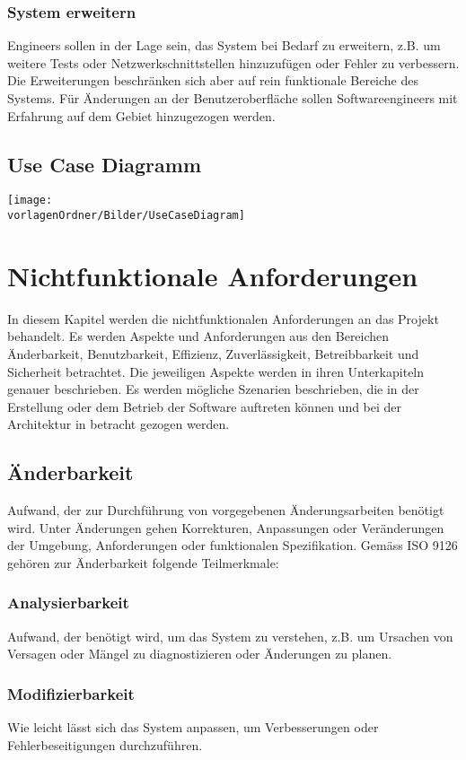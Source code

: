 \documentclass[
	ngerman,
	toc=listof, %
	toc=bibliography, %
	footnotes=multiple, %
	parskip=half, %
	numbers=noendperiod %
]{scrartcl}
\newcommand{\vorlagenOrdner}{../../99_Vorlagen} %
\begin{document}
		\subsubsection{System erweitern}
			Engineers sollen in der Lage sein, das System bei Bedarf zu erweitern, z.B. um weitere Tests oder Netzwerkschnittstellen hinzuzufügen oder Fehler zu verbessern.
			Die Erweiterungen beschränken sich aber auf rein funktionale Bereiche des Systems. Für Änderungen an der Benutzeroberfläche sollen Softwareengineers mit Erfahrung auf dem Gebiet hinzugezogen werden.
			 
			
	\subsection{Use Case Diagramm}
		\texttt{[image: \\vorlagenOrdner/Bilder/UseCaseDiagram]}

\section{Nichtfunktionale Anforderungen}
	In diesem Kapitel werden die nichtfunktionalen Anforderungen an das Projekt behandelt.
	Es werden Aspekte und Anforderungen aus den Bereichen Änderbarkeit, Benutzbarkeit, Effizienz, Zuverlässigkeit, Betreibbarkeit und Sicherheit betrachtet.
	Die jeweiligen Aspekte werden in ihren Unterkapiteln genauer beschrieben.
	Es werden mögliche Szenarien beschrieben, die in der Erstellung oder dem Betrieb der Software auftreten können und bei der Architektur in betracht gezogen werden.

	\subsection{Änderbarkeit}
		Aufwand, der zur Durchführung von vorgegebenen Änderungsarbeiten benötigt wird.
		Unter Änderungen gehen Korrekturen, Anpassungen oder Veränderungen der Umgebung, Anforderungen oder funktionalen Spezifikation.
		Gemäss ISO 9126 gehören zur Änderbarkeit folgende Teilmerkmale:
		
		\subsubsection{Analysierbarkeit}
			Aufwand, der benötigt wird, um das System zu verstehen, z.B. um Ursachen von Versagen oder Mängel zu diagnostizieren oder Änderungen zu planen.

		\subsubsection{Modifizierbarkeit}
			Wie leicht lässt sich das System anpassen, um Verbesserungen oder Fehlerbeseitigungen durchzuführen.
\end{document}
